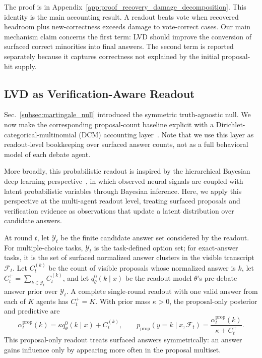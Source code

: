 \documentclass{article}
\newcommand{\secref}[1]{Sec.~\ref{#1}}
\newcommand{\appref}[1]{Appendix~\ref{#1}}
\begin{document}
The proof is in \appref{app:proof_recovery_damage_decomposition}.
This identity is the main accounting result. A readout beats vote when recovered
headroom plus new-correctness exceeds damage to vote-correct cases. Our main
mechanism claim concerns the first term: LVD should improve the conversion of
surfaced correct minorities into final answers. The second term is reported
separately because it captures correctness not explained by the initial
proposal-hit supply.

\subsection{LVD as Verification-Aware Readout}
\label{subsec:lvd_model}
\label{subsec:lvd_recovery_condition}

\secref{subsec:martingale_null} introduced the symmetric truth-agnostic null.
We now make the corresponding proposal-count baseline explicit with a
Dirichlet-categorical-multinomial (DCM) accounting layer~\citep{choi2026debate}. Note that we use this layer as readout-level bookkeeping over surfaced answer
counts, not as a full behavioral model of each debate agent.

More broadly, this probabilistic readout is inspired by the hierarchical
Bayesian deep learning perspective~\citep{BDL,BDLSurvey,VDI}, in which observed neural signals are coupled with latent probabilistic variables through
Bayesian inference. Here, we apply this perspective at the multi-agent
readout level, treating surfaced proposals and verification evidence as
observations that update a latent distribution over candidate answers.

At round $t$, let $\mathcal Y_t$ be the finite candidate answer set considered by the readout.
For multiple-choice tasks, $\mathcal Y_t$ is the task-defined option set; for
exact-answer tasks, it is the set of surfaced normalized answer clusters in the
visible transcript $\mathcal F_t$. Let $C_t^{(k)}$ be the count of visible
proposals whose normalized answer is $k$, let
$C_t^+=\sum_{k\in\mathcal Y_t}C_t^{(k)}$, and let
$q_\theta^0(k\mid x)$ be the readout model $\theta$'s pre-debate answer prior over
$\mathcal Y_t$. A complete single-round readout with one valid answer from each
of $K$ agents has $C_t^+=K$. With prior mass $\kappa>0$, the proposal-only
posterior and predictive are
\begin{equation}
    \alpha_t^{\mathrm{prop}}(k)
    =
    \kappa q_\theta^0(k\mid x)+C_t^{(k)},
    \qquad
    p_{\mathrm{prop}}(y=k\mid x,\mathcal F_t)
    =
    \frac{\alpha_t^{\mathrm{prop}}(k)}{\kappa+C_t^+}.
    \label{eq:prop_alpha}
\end{equation}
This proposal-only readout treats surfaced answers symmetrically: an answer
gains influence only by appearing more often in the proposal multiset.
\end{document}
